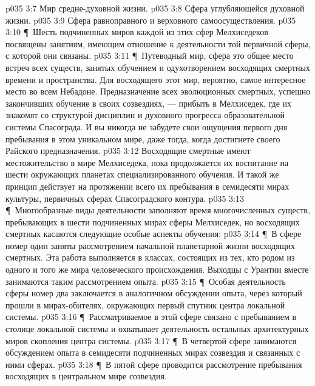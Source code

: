 \vs p035 3:7 \bibnobreakspace Мир средне\hyp{}духовной жизни.
\vs p035 3:8 \bibnobreakspace Сфера углубляющейся духовной жизни.
\vs p035 3:9 \bibnobreakspace Сфера равноправного и верховного самоосуществления.
\vs p035 3:10 \P\ Шесть подчиненных миров каждой из этих сфер Мелхиседеков посвящены занятиям, имеющим отношение к деятельности той первичной сферы, с которой они связаны.
\vs p035 3:11 \P\ Путеводный мир, сфера  это общее место встреч всех существ, занятых обучением и одухотворением восходящих смертных времени и пространства. Для восходящего этот мир, вероятно, самое интересное место во всем Небадоне. Предназначение всех эволюционных смертных, успешно закончивших обучение в своих созвездиях, --- прибыть в Мелхиседек, где их знакомят со структурой дисциплин и духовного прогресса образовательной системы Спасограда. И вы никогда не забудете свои ощущения первого дня пребывания в этом уникальном мире, даже тогда, когда достигнете своего Райского предназначения.
\vs p035 3:12 Восходящие смертные имеют местожительство в мире Мелхиседека, пока продолжается их воспитание на шести окружающих планетах специализированного обучения. И такой же принцип действует на протяжении всего их пребывания в семидесяти мирах культуры, первичных сферах Спасоградского контура.
\vs p035 3:13 \P\ Многообразные виды деятельности заполняют время многочисленных существ, пребывающих в шести подчиненных мирах сферы Мелхиседек, но восходящих смертных касаются следующие особые аспекты обучения:
\vs p035 3:14 \P\ \bibnobreakspace В сфере номер один заняты рассмотрением начальной планетарной жизни восходящих смертных. Эта работа выполняется в классах, состоящих из тех, кто родом из одного и того же мира человеческого происхождения. Выходцы с Урантии вместе занимаются таким рассмотрением опыта.
\vs p035 3:15 \P\ \bibnobreakspace Особая деятельность сферы номер два заключается в аналогичном обсуждении опыта, через который прошли в мирах\hyp{}обителях, окружающих первый спутник центра локальной системы.
\vs p035 3:16 \P\ \bibnobreakspace Рассматриваемое в этой сфере связано с пребыванием в столице локальной системы и охватывает деятельность остальных архитектурных миров скопления центра системы.
\vs p035 3:17 \P\ \bibnobreakspace В четвертой сфере занимаются обсуждением опыта в семидесяти подчиненных мирах созвездия и связанных с ними сферах.
\vs p035 3:18 \P\ \bibnobreakspace В пятой сфере проводится рассмотрение пребывания восходящих в центральном мире созвездия.
